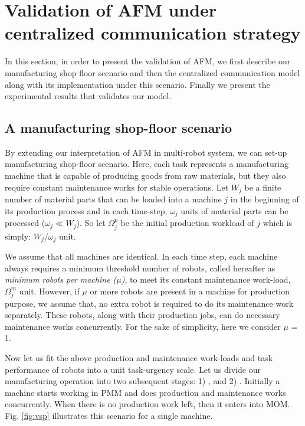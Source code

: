 \documentclass{intech}
\begin{document}
\section{Validation of AFM under centralized communication strategy}
In this section, in order to present the validation of AFM, we first describe our manufacturing shop floor scenario and then the centralized communication model along with its implementation under this scenario. Finally we present the experimental results that validates our model.
\subsection{A manufacturing shop-floor scenario}
By extending our interpretation of AFM in multi-robot system, we can set-up manufacturing shop-floor  scenario. Here, each task represents a manufacturing machine that is  capable of producing goods from raw materials, but they also require constant maintenance works for stable operations. Let $W_{j}$ be a finite number of material parts that can be loaded into a machine $j$ in the beginning of its production process and in each time-step, $\omega_{j}$ units of material parts can be processed  ($\omega_{j} \ll W_{j} $). So let $\Omega_{j}^{p}$ be the initial production workload of $j$ which is simply: $W_{j} / \omega_{j}$ unit.

We assume that all machines are identical. In each time step, each machine always requires a minimum threshold number of robots, called hereafter as {\em minimum robots per machine ($\mu$)}, to meet its constant maintenance work-load, $\Omega_{j}^{m}$ unit. However, if $\mu$ or more robots are present in a machine for production purpose, we assume that, no extra robot is required to do its maintenance work separately. These robots, along with their production jobs, can do necessary maintenance works concurrently. For the sake of simplicity, here we consider $\mu$ = 1.

Now let us fit the above production and maintenance work-loads and task performance of robots into a unit task-urgency scale. Let us divide our manufacturing operation into two subsequent stages: 1) , and 2) . Initially a machine starts working in PMM and does production and maintenance works concurrently. When there is no production work left, then it  enters into MOM. Fig. \ref{fig:vsp} illustrates this scenario for a single machine.
\end{document}
